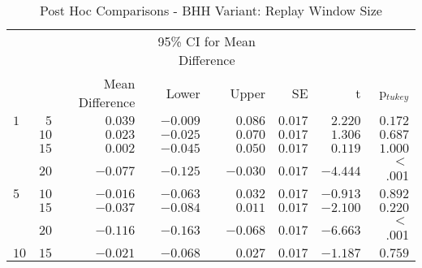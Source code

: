 \begin{table}[htb]
	\centering
	\caption{Post Hoc Comparisons - BHH Variant: Replay Window Size}
	\label{tab:results:replay:post_hoc}%
	\par\bigskip
	\resizebox{\textwidth}{!}
	{
		\begin{tabular}{lrrrrrrr}
			\toprule
			\multicolumn{1}{c}{} & \multicolumn{1}{c}{} & \multicolumn{1}{c}{} & \multicolumn{2}{c}{95\% CI for Mean Difference} & \multicolumn{1}{c}{} & \multicolumn{1}{c}{} & \multicolumn{1}{c}{}               \\
			\cline{4-5}
			$ $                  & $ $                  & Mean Difference      & Lower                                           & Upper                & SE                   & t                    & p$_{tukey}$ \\
			\cmidrule[0.4pt]{1-8}
			$1$                  & $5$                  & $0.039$              & $-0.009$                                        & $0.086$              & $0.017$              & $2.220$              & $0.172$     \\
			$ $                  & $10$                 & $0.023$              & $-0.025$                                        & $0.070$              & $0.017$              & $1.306$              & $0.687$     \\
			                     & $15$                 & $0.002$              & $-0.045$                                        & $0.050$              & $0.017$              & $0.119$              & $1.000$     \\
			                     & $20$                 & $-0.077$             & $-0.125$                                        & $-0.030$             & $0.017$              & $-4.444$             & $<$ .001    \\
			$5$                  & $10$                 & $-0.016$             & $-0.063$                                        & $0.032$              & $0.017$              & $-0.913$             & $0.892$     \\
			$ $                  & $15$                 & $-0.037$             & $-0.084$                                        & $0.011$              & $0.017$              & $-2.100$             & $0.220$     \\
			                     & $20$                 & $-0.116$             & $-0.163$                                        & $-0.068$             & $0.017$              & $-6.663$             & $<$ .001    \\
			$10$                 & $15$                 & $-0.021$             & $-0.068$                                        & $0.027$              & $0.017$              & $-1.187$             & $0.759$     \\

\end{tabular}}
\end{table}
